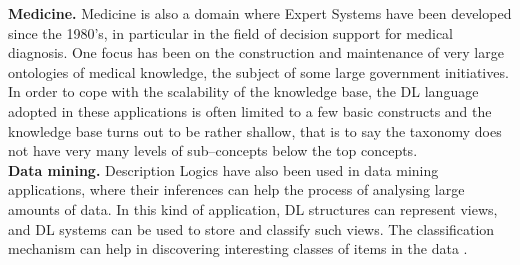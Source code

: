 \documentclass[a4paper, 11pt, oneside]{duthesis}
\begin{document}
\textbf{Medicine.} Medicine is also a domain where Expert Systems have been developed since the 1980’s, in particular in the field of decision support for medical diagnosis. One focus has been on the construction and maintenance of very large ontologies of medical knowledge, the subject of some large government initiatives.
In order to cope with the scalability of the knowledge base, the DL language adopted in these applications is often limited to a few basic constructs and the knowledge base turns out to be rather shallow, that is to say the taxonomy does not have very many levels of sub--concepts below the top concepts.\\

\textbf{Data mining.} Description Logics have also been used in data mining applications, where their inferences can help the process of analysing large amounts of data.
In this kind of application, DL structures can represent views, and DL systems can be used to store and classify such views. The classification mechanism can help in discovering interesting classes of items in the data
\cite{Nardi:2003:IDL:885746.885748}.

\newpage
\end{document}
